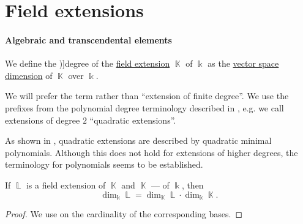 \section{Field extensions}\label{sec:field_extensions}

\paragraph{Algebraic and transcendental elements}

\begin{definition}\label{def:field_extension_degree}
  We define the \term[ru=степень (def. \cite[9.5.1]{Винберг2014КурсАлгебры})]{degree} of the \hyperref[def:field/submodel]{field extension} \( \BbbK \) of \( \Bbbk \) as the \hyperref[thm:vector_space_dimension]{vector space dimension} of \( \BbbK \) over \( \Bbbk \).

  We will prefer the term  rather than \enquote{extension of finite degree}. We use the prefixes from the polynomial degree terminology described in , e.g. we call extensions of degree \( 2 \) \enquote{quadratic extensions}.
\end{definition}
\begin{comments}
  \item As shown in , quadratic extensions are described by quadratic minimal polynomials. Although this does not hold for extensions of higher degrees, the terminology for polynomials seems to be established.
\end{comments}

\begin{proposition}\label{thm:intermediate_field_extension_degree}
  If \( \BbbL \) is a field extension of \( \BbbK \) and \( \BbbK \) --- of \( \Bbbk \), then
  \begin{equation}\label{eq:thm:intermediate_field_extension_degree}
    \dim_\Bbbk \BbbL = \dim_\BbbK \BbbL \cdot \dim_\Bbbk \BbbK.
  \end{equation}
\end{proposition}
\begin{proof}
  We use  on the cardinality of the corresponding bases.
\end{proof}

